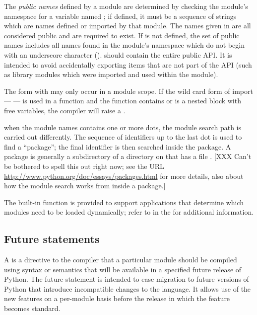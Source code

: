The \emph{public names} defined by a module are determined by checking
the module's namespace for a variable named ; if
defined, it must be a sequence of strings which are names defined or
imported by that module.  The names given in  are all
considered public and are required to exist.  If  is not
defined, the set of public names includes all names found in the
module's namespace which do not begin with an underscore character
(\character{_}).   should contain the entire public API.
It is intended to avoid accidentally exporting items that are not part
of the API (such as library modules which were imported and used within
the module).

The  form with \samp{*} may only occur in a module
scope.  If the wild card form of import ---  --- is
used in a function and the function contains or is a nested block with
free variables, the compiler will raise a .


when the module names contains one or more dots, the module search
path is carried out differently.  The sequence of identifiers up to
the last dot is used to find a ``package''; the final
identifier is then searched inside the package.  A package is
generally a subdirectory of a directory on  that has a
file .
%
[XXX Can't be bothered to spell this out right now; see the URL
\url{http://www.python.org/doc/essays/packages.html} for more details, also
about how the module search works from inside a package.]

The built-in function  is provided to support
applications that determine which modules need to be loaded
dynamically; refer to  in the
 for additional
information.

\subsection{Future statements \label{future}}

A  is a directive to
the compiler that a particular module should be compiled using syntax
or semantics that will be available in a specified future release of
Python.  The future statement is intended to ease migration to future
versions of Python that introduce incompatible changes to the
language.  It allows use of the new features on a per-module basis
before the release in which the feature becomes standard.

